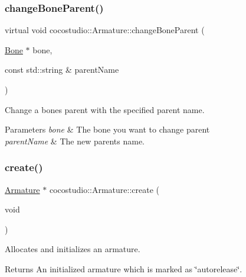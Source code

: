 \subsubsection{\texorpdfstring{change\+Bone\+Parent()}{changeBoneParent()}\hspace{0.1cm}{\footnotesize\ttfamily [2/2]}}
{\footnotesize\ttfamily virtual void cocostudio\+::\+Armature\+::change\+Bone\+Parent (\begin{DoxyParamCaption}\item[{\hyperlink{classcocostudio_1_1Bone}{Bone} $\ast$}]{bone,  }\item[{const std\+::string \&}]{parent\+Name }\end{DoxyParamCaption})\hspace{0.3cm}{\ttfamily [virtual]}}

Change a bone\textquotesingle{}s parent with the specified parent name.


\begin{DoxyParams}{Parameters}
{\em bone} & The bone you want to change parent \\
\hline
{\em parent\+Name} & The new parent\textquotesingle{}s name. \\
\hline
\end{DoxyParams}
\mbox{\label{classcocostudio_1_1Armature_aa6c6116e301706938905b26b27a33de9}} 
\subsubsection{\texorpdfstring{create()}{create()}\hspace{0.1cm}{\footnotesize\ttfamily [1/4]}}
{\footnotesize\ttfamily \hyperlink{classcocostudio_1_1Armature}{Armature} $\ast$ cocostudio\+::\+Armature\+::create (\begin{DoxyParamCaption}\item[{void}]{ }\end{DoxyParamCaption})\hspace{0.3cm}{\ttfamily [static]}}

Allocates and initializes an armature. \begin{DoxyReturn}{Returns}
An initialized armature which is marked as \char`\"{}autorelease\char`\"{}. 
\end{DoxyReturn}
\mbox{\label{classcocostudio_1_1Armature_ab6588941f349230af3314e190fe6eb83}} 
